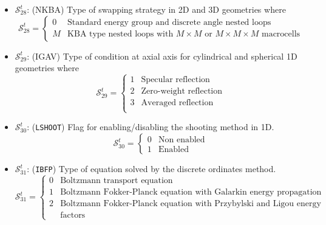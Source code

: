 \begin{itemize}
\item $\mathcal{S}^{t}_{28}$: (NKBA) Type of swapping strategy in 2D and 3D geometries where
\begin{displaymath}
\mathcal{S}^{t}_{28} = \left\{
\begin{array}{rl}
 0 & \textrm{Standard energy group and discrete angle nested loops}\\
 M & \textrm{KBA type nested loops with $M\times M$ or $M \times M \times M$ macrocells}
\end{array} \right.
\end{displaymath}

\item $\mathcal{S}^{t}_{29}$: (IGAV) Type of condition at axial axis for cylindrical and spherical 1D geometries where
\begin{displaymath}
\mathcal{S}^{t}_{29} = \left\{
\begin{array}{rl}
 1 & \textrm{Specular reflection}\\
 2 & \textrm{Zero-weight reflection}\\
 3 & \textrm{Averaged reflection}\\
\end{array} \right.
\end{displaymath}

\item $\mathcal{S}^{t}_{30}$: ({\tt LSHOOT}) Flag for enabling/disabling the shooting method in 1D.
\begin{displaymath}
\mathcal{S}^{t}_{30} = \left\{
\begin{array}{rl}
 0 & \textrm{Non enabled} \\
 1 & \textrm{Enabled}
\end{array} \right.
\end{displaymath}

\item $\mathcal{S}^{t}_{31}$: ({\tt IBFP}) Type of equation solved by the discrete ordinates method.
\begin{displaymath}
\mathcal{S}^{t}_{31} = \left\{
\begin{array}{rl}
 0 & \textrm{Boltzmann transport equation} \\
 1 & \textrm{Boltzmann Fokker-Planck equation with Galarkin energy propagation factors} \\
 2 & \textrm{Boltzmann Fokker-Planck equation with Przybylski and Ligou energy propagation} \\
  & \textrm{factors}
\end{array} \right.
\end{displaymath}


\end{itemize}
